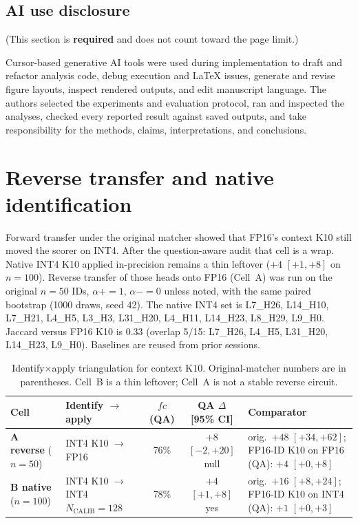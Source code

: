 \documentclass{article} %
\begin{document}
\subsection*{AI use disclosure}
\label{sec:ai}

(This section is \textbf{required} and does not count toward the page limit.)

Cursor-based generative AI tools were used during implementation to draft and refactor analysis code, debug execution and LaTeX issues, generate and revise figure layouts, inspect rendered outputs, and edit manuscript language. The authors selected the experiments and evaluation protocol, ran and inspected the analyses, checked every reported result against saved outputs, and take responsibility for the methods, claims, interpretations, and conclusions.

\clearpage



\clearpage
\appendix

\section{Reverse transfer and native identification}
\label{app:reverse}

Forward transfer under the original matcher showed that FP16's context K10 still moved the scorer on INT4. After the question-aware audit that cell is a wrap. Native INT4 K10 applied in-precision remains a thin leftover ($+4$ $[+1,+8]$ on $n{=}100$). Reverse transfer of those heads onto FP16 (Cell~A) was run on the original $n{=}50$ IDs, $\alpha{+}{=}1$, $\alpha{-}{=}0$ unless noted, with the same paired bootstrap (1000 draws, seed 42). The native INT4 set is L7\_H26, L14\_H10, L7\_H21, L4\_H5, L3\_H3, L31\_H20, L4\_H11, L14\_H23, L8\_H29, L9\_H0. Jaccard versus FP16 K10 is $0.33$ (overlap 5/15: L7\_H26, L4\_H5, L31\_H20, L14\_H23, L9\_H0). Baselines are reused from prior sessions.

\begin{table}[h]
\caption{Identify$\times$apply triangulation for context K10. Original-matcher numbers are in parentheses. Cell~B is a thin leftover; Cell~A is not a stable reverse circuit.}
\label{tab:cells}
\centering
\footnotesize
\setlength{\tabcolsep}{2pt}
\begin{tabular}{lp{0.95in}ccp{1.7in}}
\toprule
Cell & Identify $\to$ apply & $fc$ (QA) & QA $\Delta$ [95\% CI] & Comparator \\
\midrule
\textbf{A reverse} ($n{=}50$) & INT4 K10 $\to$ FP16 & 76\% & $+8$ $[-2,+20]$ null & orig.\ $+48$ $[+34,+62]$; FP16-ID K10 on FP16 (QA): $+4$ $[+0,+8]$ \\
\textbf{B native} ($n{=}100$) & INT4 K10 $\to$ INT4 $N_{\mathrm{CALIB}}{=}128$ & 78\% & $+4$ $[+1,+8]$ yes & orig.\ $+16$ $[+8,+24]$; FP16-ID K10 on INT4 (QA): $+1$ $[+0,+3]$ \\
\bottomrule
\end{tabular}
\end{table}
\end{document}
